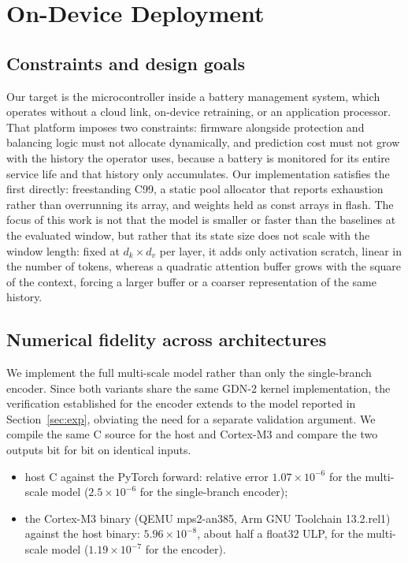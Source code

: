 \section{On-Device Deployment}
\label{sec:deploy}


\subsection{Constraints and design goals}

Our target is the microcontroller inside a battery management system,
which operates without a cloud link, on-device retraining, or an
application processor. That platform imposes two constraints: firmware
alongside protection and balancing logic must not allocate dynamically,
and prediction cost must not grow with the history the operator uses,
because a battery is monitored for its entire service life and that
history only accumulates. Our implementation satisfies the first
directly: freestanding C99, a static pool allocator that reports
exhaustion rather than overrunning its array, and weights held as
const arrays in flash. The focus of this work is not that the model is smaller or faster 
than the baselines at the evaluated window, but rather that its state size does not scale with the window length: 
fixed at $d_k\times d_v$ per layer, it adds only activation scratch, linear in the number of tokens,
whereas a quadratic attention buffer grows with the square of the
context, forcing a larger buffer or a coarser representation of the same
history.

\subsection{Numerical fidelity across architectures}

We implement the full multi-scale model rather than only the single-branch encoder. 
Since both variants share the same GDN-2 kernel implementation, 
the verification established for the encoder extends to the model reported in Section~\ref{sec:exp},
obviating the need for a separate validation argument. 
We compile the same C source for the host and Cortex-M3 and compare the two outputs bit for bit on identical inputs.


\begin{itemize}
\item host C against the PyTorch forward: relative error
  $1.07\times10^{-6}$ for the multi-scale model
  ($2.5\times10^{-6}$ for the single-branch encoder);
\item the Cortex-M3 binary (QEMU mps2-an385, Arm GNU Toolchain
  13.2.rel1) against the host binary: $5.96\times10^{-8}$, about half a
  float32 ULP, for the multi-scale model ($1.19\times10^{-7}$ for the
  encoder).
\end{itemize}

